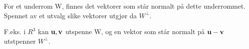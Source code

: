 For et underrom W, finnes det vektorer som står normalt på dette underrommet.
Spennet av et utvalg slike vektorer utgjør da $W^\perp$.

F.eks. i $R^3$ kan $\mathbf{u},\mathbf{v}$ utspenne W, og en vektor som står normalt
på $\mathbf{u}-\mathbf{v}$ utstpenner $W^\perp$.
